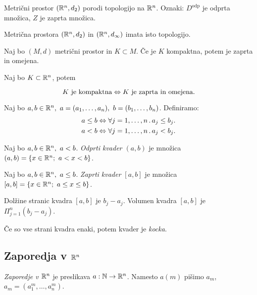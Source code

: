 Metrični prostor $(\mathbb{R}^n, d_2)$ porodi topologijo na $\mathbb{R}^n$. Oznaki: $D^\text{odp}$ je odprta množica, $Z$ je zaprta množica.

\begin{opomba}
    Metrična prostora $(\mathbb{R}^n, d_2)$ in $(\mathbb{R}^n, d_\infty)$ imata isto topologijo.
\end{opomba}

\begin{trditev}
    Naj bo $(M, d)$ metrični prostor in $K \subset M$. Če je $K$ kompaktna, potem je zaprta in omejena.
\end{trditev}

\begin{izrek}
    Naj bo $K \subset \mathbb{R}^n$, potem

    $$K \text{ je kompaktna} \Leftrightarrow K \text{ je zaprta in omejena}.$$
\end{izrek}

\begin{definicija}
    Naj bo $a, b \in \mathbb{R}^n, \ a = (a_1, \ldots, a_n), \ b= (b_1, \ldots, b_n)$. Definiramo:
    \begin{align*}
        a \leq b \Leftrightarrow \forall j = 1, \ldots, n \,.\, a_j \leq b_j. \\
        a < b \Leftrightarrow \forall j = 1, \ldots, n \,.\, a_j < b_j.
    \end{align*}
\end{definicija}

\begin{definicija}
    Naj bo $a, b \in \mathbb{R}^n, \ a< b$. \emph{Odprti kvader $(a,b)$} je množica $(a,b) = \set{x \in \RR^n; \ a<x<b}$.

    Naj bo $a, b \in \mathbb{R}^n, \ a \leq b$. \emph{Zaprti kvader $[a,b]$} je množica $[a,b] = \left\{x \in \mathbb{R}^n; \ a \leq x \leq b\right\}$.
\end{definicija}

\begin{opomba}
    Dolžine stranic kvadra $[a,b]$ je $b_j-a_j$. Volumen kvadra $[a,b]$ je $\Pi_{j=1}^n(b_j-a_j)$. 
    
    Če so vse strani kvadra enaki, potem kvader je \emph{kocka}.
\end{opomba}

\newpage
\subsection{Zaporedja v $\mathbb{R}^n$}
\begin{definicija}
    \emph{Zaporedje v $\mathbb{R}^n$} je preslikava $a: \mathbb{N} \to \mathbb{R}^n$. Namesto $a(m)$ pišimo $a_m$, $a_m = (a_1^m, \ldots, a_n^m)$.
\end{definicija}

